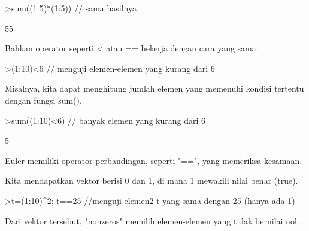 \documentclass{article}
\newenvironment{eulernotebook}{\par}{\par}
\newenvironment{eulercomment}{\par\medskip}{\par\medskip}
\begin{document}
\begin{eulernotebook}
\begin{eulercomment}
\begin{eulercomment}
\begin{eulercomment}
\begin{eulercomment}
\begin{eulerprompt}
>sum((1:5)*(1:5)) // sama hasilnya
\end{eulerprompt}
\begin{euleroutput}
  55
\end{euleroutput}
\begin{eulercomment}
Bahkan operator seperti \textless{} atau == bekerja dengan cara yang sama.
\end{eulercomment}
\begin{eulerprompt}
>(1:10)<6 // menguji elemen-elemen yang kurang dari 6
\end{eulerprompt}
\begin{euleroutput}
  [1,  1,  1,  1,  1,  0,  0,  0,  0,  0]
\end{euleroutput}
\begin{eulercomment}
Misalnya, kita dapat menghitung jumlah elemen yang memenuhi kondisi
tertentu dengan fungsi sum().
\end{eulercomment}
\begin{eulerprompt}
>sum((1:10)<6) // banyak elemen yang kurang dari 6
\end{eulerprompt}
\begin{euleroutput}
  5
\end{euleroutput}
\begin{eulercomment}
﻿Euler memiliki operator perbandingan, seperti "==", yang
memeriksa kesamaan.

Kita mendapatkan vektor berisi 0 dan 1, di mana 1 mewakili nilai benar
(true).
\end{eulercomment}
\begin{eulerprompt}
>t=(1:10)^2; t==25 //menguji elemen2 t yang sama dengan 25 (hanya ada 1)
\end{eulerprompt}
\begin{euleroutput}
  [0,  0,  0,  0,  1,  0,  0,  0,  0,  0]
\end{euleroutput}
\begin{eulercomment}
﻿Dari vektor tersebut, "nonzeros" memilih elemen-elemen yang
tidak bernilai nol.


\end{eulercomment}
\end{eulercomment}
\end{eulercomment}
\end{eulercomment}
\end{eulercomment}
\end{eulernotebook}
\end{document}
